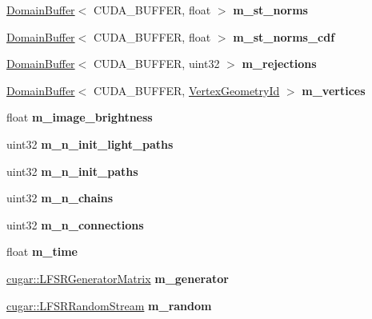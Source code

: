 \begin{DoxyCompactItemize}
\mbox{\label{struct_c_m_l_t_a0fa7f491dc75c81324549052e3a8890f}} 
\hyperlink{class_domain_buffer}{Domain\+Buffer}$<$ C\+U\+D\+A\+\_\+\+B\+U\+F\+F\+ER, float $>$ {\bfseries m\+\_\+st\+\_\+norms}
\item 
\mbox{\label{struct_c_m_l_t_acc1916afe48863baad162c48c6d363ea}} 
\hyperlink{class_domain_buffer}{Domain\+Buffer}$<$ C\+U\+D\+A\+\_\+\+B\+U\+F\+F\+ER, float $>$ {\bfseries m\+\_\+st\+\_\+norms\+\_\+cdf}
\item 
\mbox{\label{struct_c_m_l_t_ab3348fb7001a7f91ac20e0b7926738bf}} 
\hyperlink{class_domain_buffer}{Domain\+Buffer}$<$ C\+U\+D\+A\+\_\+\+B\+U\+F\+F\+ER, uint32 $>$ {\bfseries m\+\_\+rejections}
\item 
\mbox{\label{struct_c_m_l_t_ae08cdbc80dcbba3b60546722bd496974}} 
\hyperlink{class_domain_buffer}{Domain\+Buffer}$<$ C\+U\+D\+A\+\_\+\+B\+U\+F\+F\+ER, \hyperlink{struct_vertex_geometry_id}{Vertex\+Geometry\+Id} $>$ {\bfseries m\+\_\+vertices}
\item 
\mbox{\label{struct_c_m_l_t_a30ab1986197fdec50df5230ccb1ebf98}} 
float {\bfseries m\+\_\+image\+\_\+brightness}
\item 
\mbox{\label{struct_c_m_l_t_a35b8bc114ce9e815175287c343f0f8fb}} 
uint32 {\bfseries m\+\_\+n\+\_\+init\+\_\+light\+\_\+paths}
\item 
\mbox{\label{struct_c_m_l_t_ab6e192224acb5572df370e6acd344904}} 
uint32 {\bfseries m\+\_\+n\+\_\+init\+\_\+paths}
\item 
\mbox{\label{struct_c_m_l_t_ad56c788c77c282ca7e245641074e1ec6}} 
uint32 {\bfseries m\+\_\+n\+\_\+chains}
\item 
\mbox{\label{struct_c_m_l_t_a94f5718a5d2127a60db1f3ff1d8c5e5d}} 
uint32 {\bfseries m\+\_\+n\+\_\+connections}
\item 
\mbox{\label{struct_c_m_l_t_aec650a2305a3be2386f78216bbbf5182}} 
float {\bfseries m\+\_\+time}
\item 
\mbox{\label{struct_c_m_l_t_a1988ed931c88f3b54e56bb2d41a05131}} 
\hyperlink{classcugar_1_1_l_f_s_r_generator_matrix}{cugar\+::\+L\+F\+S\+R\+Generator\+Matrix} {\bfseries m\+\_\+generator}
\item 
\mbox{\label{struct_c_m_l_t_a498e75f661fa9e5f68094cc0bc0fb965}} 
\hyperlink{structcugar_1_1_l_f_s_r_random_stream}{cugar\+::\+L\+F\+S\+R\+Random\+Stream} {\bfseries m\+\_\+random}
\end{DoxyCompactItemize}


